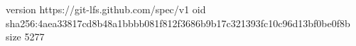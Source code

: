 version https://git-lfs.github.com/spec/v1
oid sha256:4aea33817cd8b48a1bbbb081f812f3686b9b17c321393fc10c96d13bf0be0f8b
size 5277
